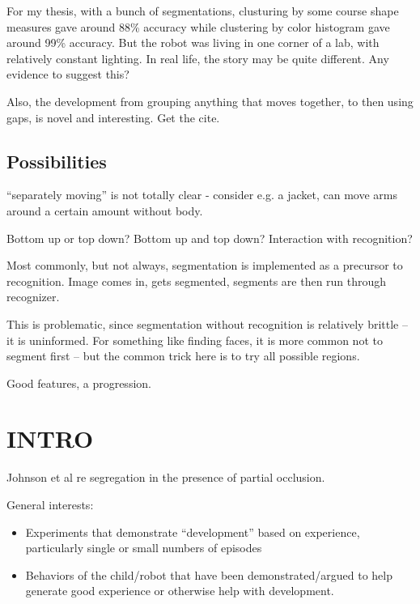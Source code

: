 For my thesis, with a bunch of segmentations, clusturing by
some course shape measures gave around 88\% accuracy while
clustering by color histogram gave around 99\% accuracy.
But the robot was living in one corner of a lab, with 
relatively constant lighting.  In real life, the story may
be quite different.  Any evidence to suggest this?

Also, the development from grouping anything that moves
together, to then using gaps, is novel and interesting.
Get the cite.




\subsection{Possibilities}

``separately moving'' is not totally clear - consider e.g. a 
jacket, can move arms around a certain amount without body.

Bottom up or top down?  Bottom up and top down?  Interaction
with recognition?

Most commonly, but not always, segmentation is implemented
as a precursor to recognition.  Image comes in, gets
segmented, segments are then run through recognizer.

This is problematic, since segmentation without
recognition is relatively brittle -- it is uninformed.
For something like finding faces, it is more common
not to segment first -- but the common trick here
is to try all possible regions.

Good features, a progression.


\section{INTRO}


Johnson et al re segregation in the presence of partial occlusion.



\noindent General interests:

\begin{itemize}

\item Experiments that demonstrate ``development'' based on experience,
   particularly single or small numbers of episodes

\item Behaviors of the child/robot that have been demonstrated/argued
   to help generate good experience or otherwise help with development.

\end{itemize}


